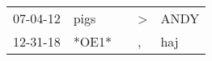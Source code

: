 \begin{supertabular}{p{0.07\textwidth}p{0.06\textwidth}p{0.02\textwidth}p{0.02\textwidth}p{0.06\textwidth}}
 07-04-12\textsuperscript{} &  pigs\textsuperscript{} &   &  \textgreater &  ANDY\textsuperscript{} \\
 12-31-18\textsuperscript{} &                   *OE1* &   &             , &   haj\textsuperscript{} \\
\end{supertabular}

